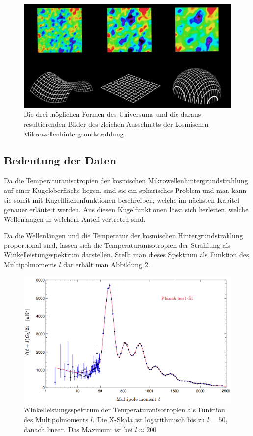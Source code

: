 \begin{figure}
	\includegraphics[width=\linewidth]{cmb/images/universe_shapes.jpg}
	\caption{Die drei möglichen Formen des Universums und die daraus 
		resultierenden Bilder des gleichen Ausschnitts der kosmischen
		Mikrowellenhintergrundstrahlung}
	\label{fig:universe_shapes}
\end{figure}

\subsection{Bedeutung der Daten}
Da die Temperaturanisotropien der kosmischen Mikrowellenhintergrundstrahlung auf einer
Kugeloberfläche liegen, sind sie ein sphärisches Problem und man kann sie somit mit 
Kugelflächenfunktionen beschreiben, welche im nächsten Kapitel genauer erläutert werden.
Aus diesen Kugelfunktionen lässt sich herleiten, welche Wellenlängen in welchem Anteil vertreten sind.

Da die Wellenlängen und die Temperatur der kosmischen Hintergrundstrahlung proportional sind, lassen sich die Temperaturanisotropien der Strahlung als Winkelleistungsspektrum darstellen.
Stellt man dieses Spektrum als Funktion des Multipolmoments $l$ dar erhält man 
Abbildung \ref{fig:planck_spectrum}.

\begin{figure}
	\includegraphics[width=\linewidth]{cmb/images/mission_spectrum.png}
	\caption{Winkelleistungsspektrum der Temperaturanisotropien als Funktion 
	des Multipolmoments $l$.
	Die X-Skala ist logarithmisch bis zu $l = 50$, danach linear. Das Maximum 
	ist bei $l \approx 200$}
	\label{fig:planck_spectrum}
\end{figure}

